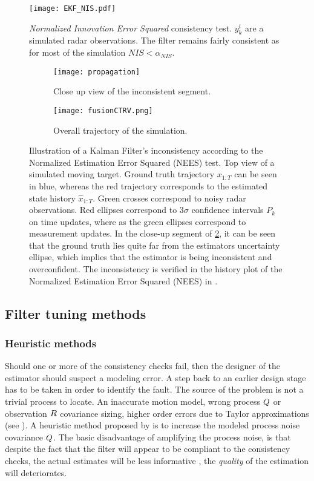 \begin{figure}[H]
	\centering
	\texttt{[image: EKF\_NIS.pdf]}
	\caption{\emph{Normalized Innovation Error Squared} consistency test. $y^i_k$ are a simulated radar observations. The filter remains fairly consistent as for most of the simulation $NIS < \alpha_{NIS}$.}
	\label{fig:ekfNIS}
\end{figure}

\begin{figure}[H]
	\begin{subfigure}[b]{.8\textwidth}
		\centering
		\texttt{[image: propagation]}
		\caption{Close up view of the inconsistent segment.}
		\label{fig:KFinconsistent1}
	\end{subfigure}\hfill
	\begin{subfigure}[b]{.8\textwidth}
		\centering
		\texttt{[image: fusionCTRV.png]}
		\caption{Overall trajectory of the simulation.}
		\label{fig:KFinconsistent2}
	\end{subfigure}
	\caption{Illustration of a Kalman Filter's inconsistency according to the Normalized Estimation Error Squared (NEES) test. Top view of a simulated moving target. Ground truth trajectory $x_{1:T}$ can be seen in blue,  whereas the red trajectory corresponds to the estimated state history $\hat{x}_{1:T}$. Green crosses correspond to noisy radar observations. Red ellipses correspond to $3\sigma$ confidence intervals $P_k$ on time updates, where as the green ellipses correspond to measurement updates. In the close-up segment of \cref{fig:KFinconsistent1}, it can be seen that the ground truth lies quite far from the estimators uncertainty ellipse, which implies that the estimator is being inconsistent and overconfident. The inconsistency is verified in the history plot of the Normalized Estimation Error Squared (NEES) in .}
	\label{fig:KFinconsistent}
\end{figure}

\subsection{Filter tuning methods}
\subsubsection{Heuristic methods}
Should one or more of the consistency checks fail, then the designer of the estimator should suspect a modeling error. A step back to an earlier design stage has to be taken in order to identify the fault. The source of the problem is not a trivial process to locate. An inaccurate motion model, wrong process ${Q}$ or observation ${R}$ covariance sizing, higher order errors due to Taylor approximations (see ). A heuristic method proposed by \cite{BarShalom1980} is to increase the modeled process noise covariance ${Q}$. The basic disadvantage of amplifying the process noise, is that despite the fact that the filter will appear to be compliant to the consistency checks, the actual estimates will be less informative \ie, the \emph{quality} of the estimation will deteriorates.

